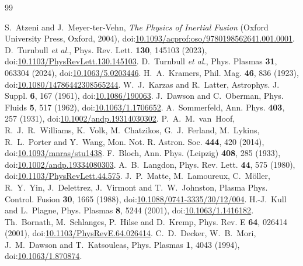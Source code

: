 \documentclass[11pt]{article}
\numberwithin{equation}{section}
\begin{document}
\begin{thebibliography}{99}
\raggedright
{} S.~Atzeni and J.~Meyer-ter-Vehn, \emph{The Physics of Inertial Fusion}
(Oxford University Press, Oxford, 2004), doi:\href{https://doi.org/10.1093/acprof:oso/9780198562641.001.0001}{10.1093/acprof:oso/9780198562641.001.0001}.
 D.~Turnbull \emph{et al.}, Phys. Rev. Lett. \textbf{130}, 145103 (2023),
doi:\href{https://doi.org/10.1103/PhysRevLett.130.145103}{10.1103/PhysRevLett.130.145103}.
 D.~Turnbull \emph{et al.}, Phys. Plasmas \textbf{31}, 063304 (2024),
doi:\href{https://doi.org/10.1063/5.0203446}{10.1063/5.0203446}.
 H.~A.~Kramers, Phil. Mag. \textbf{46}, 836 (1923),
doi:\href{https://doi.org/10.1080/14786442308565244}{10.1080/14786442308565244}.
 W.~J.~Karzas and R.~Latter, Astrophys. J. Suppl. \textbf{6}, 167 (1961),
doi:\href{https://doi.org/10.1086/190063}{10.1086/190063}.
 J.~Dawson and C.~Oberman, Phys. Fluids \textbf{5}, 517 (1962),
doi:\href{https://doi.org/10.1063/1.1706652}{10.1063/1.1706652}.
 A.~Sommerfeld, Ann. Phys. \textbf{403}, 257 (1931),
doi:\href{https://doi.org/10.1002/andp.19314030302}{10.1002/andp.19314030302}.
 P.~A.~M.~van~Hoof, R.~J.~R.~Williams, K.~Volk, M.~Chatzikos, G.~J.~Ferland,
M.~Lykins, R.~L.~Porter and Y.~Wang, Mon. Not. R. Astron. Soc. \textbf{444}, 420 (2014),
doi:\href{https://doi.org/10.1093/mnras/stu1438}{10.1093/mnras/stu1438}.
 F.~Bloch, Ann. Phys. (Leipzig) \textbf{408}, 285 (1933),
doi:\href{https://doi.org/10.1002/andp.19334080303}{10.1002/andp.19334080303}.
 A.~B.~Langdon, Phys. Rev. Lett. \textbf{44}, 575 (1980),
doi:\href{https://doi.org/10.1103/PhysRevLett.44.575}{10.1103/PhysRevLett.44.575}.
 J.~P.~Matte, M.~Lamoureux, C.~M\"oller, R.~Y.~Yin, J.~Delettrez, J.~Virmont
and T.~W.~Johnston, Plasma Phys. Control. Fusion \textbf{30}, 1665 (1988),
doi:\href{https://doi.org/10.1088/0741-3335/30/12/004}{10.1088/0741-3335/30/12/004}.
 H.-J.~Kull and L.~Plagne, Phys. Plasmas \textbf{8}, 5244 (2001),
doi:\href{https://doi.org/10.1063/1.1416182}{10.1063/1.1416182}.
 Th.~Bornath, M.~Schlanges, P.~Hilse and D.~Kremp, Phys. Rev. E \textbf{64},
026414 (2001), doi:\href{https://doi.org/10.1103/PhysRevE.64.026414}{10.1103/PhysRevE.64.026414}.
 C.~D.~Decker, W.~B.~Mori, J.~M.~Dawson and T.~Katsouleas, Phys. Plasmas
\textbf{1}, 4043 (1994), doi:\href{https://doi.org/10.1063/1.870874}{10.1063/1.870874}.

\end{thebibliography}
\end{document}
